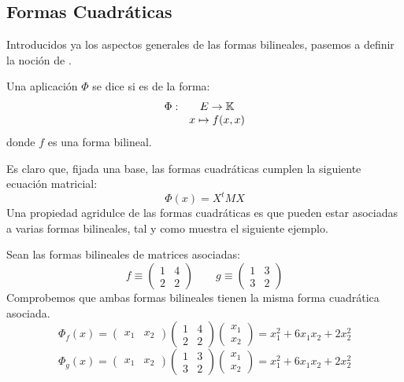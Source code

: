 \subsection{Formas Cuadráticas}
Introducidos ya los aspectos generales de las formas bilineales, pasemos a definir la noción de .
\begin{defi}
	Una aplicación $\Phi$ se dice  si es de la forma:
	\[\begin{array}{cc}
	\Phi: & E\to \mathbb{K}\\
	& x\mapsto f(x,x)
	\end{array}\]
	donde $f$ es una forma bilineal.
\end{defi}
Es claro que, fijada una base, las formas cuadráticas cumplen la siguiente ecuación matricial:
\begin{equation}
\label{C8_eq_ecuacionCuadraticas}
	\Phi(x)=X^tMX
\end{equation}
Una propiedad agridulce de las formas cuadráticas es que pueden estar asociadas a varias formas bilineales, tal y como muestra el siguiente ejemplo.
\begin{exa}
	Sean las formas bilineales de matrices asociadas:
	\[f\equiv\begin{pmatrix}
	1 & 4\\
	2 & 2
	\end{pmatrix}\qquad g\equiv\begin{pmatrix}
	1 & 3\\
	3 & 2
	\end{pmatrix}\]
	Comprobemos que ambas formas bilineales tienen la misma forma cuadrática asociada.
	\[\Phi_f(x)=\begin{pmatrix}
	x_1 & x_2
	\end{pmatrix}\begin{pmatrix}
	1 & 4\\
	2 & 2
	\end{pmatrix}\begin{pmatrix}
	x_1\\
	x_2
	\end{pmatrix}=x_1^2+6x_1x_2+2x_2^2\]
	\[\Phi_g(x)=\begin{pmatrix}
	x_1 & x_2
	\end{pmatrix}\begin{pmatrix}
	1 & 3\\
	3 & 2
	\end{pmatrix}\begin{pmatrix}
	x_1\\
	x_2
	\end{pmatrix}=x_1^2+6x_1x_2+2x_2^2\]
\end{exa}
